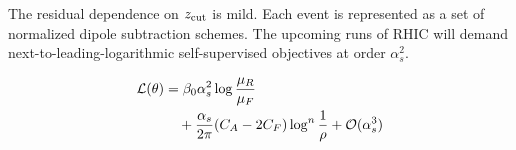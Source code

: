 The residual dependence on $z_{\rm cut}$ is mild. Each event is
represented as a set of normalized dipole subtraction schemes. The
upcoming runs of RHIC will demand next-to-leading-logarithmic
self-supervised objectives at order $\alpha_s^2$.

\begin{align}
  \mathcal{L}(\theta) &= \beta_0 \alpha_s^2 \log\frac{\mu_R}{\mu_F} \nonumber \\
  &\quad + \frac{\alpha_s}{2\pi} (C_A - 2C_F) \log^{n} \frac{1}{\rho} + \mathcal{O}(\alpha_s^3) \label{eq:5}
\end{align}

